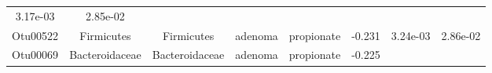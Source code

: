 \documentclass[11pt,]{article}
\begin{document}
\begin{longtable}[]{@{}cccccccc@{}}
\begin{minipage}[t]{0.08\columnwidth}
3.17e-03\strut
\end{minipage} & \begin{minipage}[t]{0.08\columnwidth}\centering\strut
2.85e-02\strut
\end{minipage}\tabularnewline
\begin{minipage}[t]{0.08\columnwidth}\centering\strut
Otu00522\strut
\end{minipage} & \begin{minipage}[t]{0.15\columnwidth}\centering\strut
Firmicutes\strut
\end{minipage} & \begin{minipage}[t]{0.15\columnwidth}\centering\strut
Firmicutes\strut
\end{minipage} & \begin{minipage}[t]{0.08\columnwidth}\centering\strut
adenoma\strut
\end{minipage} & \begin{minipage}[t]{0.09\columnwidth}\centering\strut
propionate\strut
\end{minipage} & \begin{minipage}[t]{0.07\columnwidth}\centering\strut
-0.231\strut
\end{minipage} & \begin{minipage}[t]{0.08\columnwidth}\centering\strut
3.24e-03\strut
\end{minipage} & \begin{minipage}[t]{0.08\columnwidth}\centering\strut
2.86e-02\strut
\end{minipage}\tabularnewline
\begin{minipage}[t]{0.08\columnwidth}\centering\strut
Otu00069\strut
\end{minipage} & \begin{minipage}[t]{0.15\columnwidth}\centering\strut
Bacteroidaceae\strut
\end{minipage} & \begin{minipage}[t]{0.15\columnwidth}\centering\strut
Bacteroidaceae\strut
\end{minipage} & \begin{minipage}[t]{0.08\columnwidth}\centering\strut
adenoma\strut
\end{minipage} & \begin{minipage}[t]{0.09\columnwidth}\centering\strut
propionate\strut
\end{minipage} & \begin{minipage}[t]{0.07\columnwidth}\centering\strut
-0.225\strut
\end{minipage} & \begin{minipage}[t]{0.08\columnwidth}\centering\strut

\end{minipage}
\end{longtable}
\end{document}
